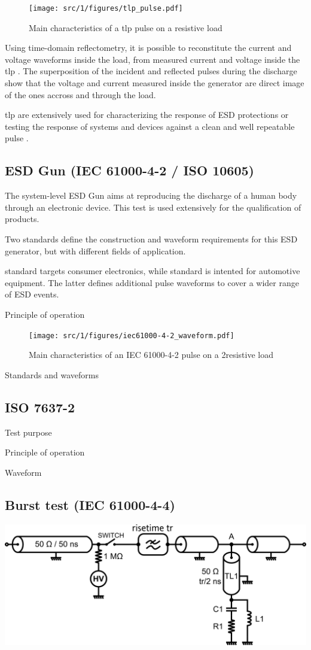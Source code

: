 \begin{figure}[h]
  \centering
  \texttt{[image: src/1/figures/tlp\_pulse.pdf]}
  \caption{Main characteristics of a \gls{tlp} pulse on a resistive load}
  \label{tlp_pulse}
\end{figure}

Using time-domain reflectometry, it is possible to reconstitute the current and voltage waveforms inside the load,
from measured current and voltage inside the \gls{tlp} \cite{TLP}.
The superposition of the incident and reflected pulses during the discharge show that the voltage and current
measured inside the generator are direct image of the ones accross and through the load.

\gls{tlp} are extensively used for characterizing the response of ESD protections \cite{TLPforESDProtectionCz}
or testing the response of systems and devices against a clean and well repeatable pulse \cite{TLPthroubleshooting, LacrampeTransientImmunity}.

\subsection{ESD Gun (IEC 61000-4-2 / ISO 10605)}
The system-level ESD Gun aims at reproducing the discharge of a human body through an electronic device.
This test is used extensively for the qualification of products.

Two standards define the construction and waveform requirements for this ESD generator, but with different fields of application.

\cite{iec61000-4-2} standard targets consumer electronics, while \cite{iso10605} standard is intented for automotive equipment.
The latter defines additional pulse waveforms to cover a wider range of ESD events.

Principle of operation

\begin{figure}[h]
  \centering
  \texttt{[image: src/1/figures/iec61000-4-2\_waveform.pdf]}
  \caption{Main characteristics of an IEC 61000-4-2 pulse on a 2\Omega resistive load}
  \label{tlp_pulse}
\end{figure}

Standards and waveforms

\subsection{ISO 7637-2}
Test purpose

Principle of operation

Waveform

\subsection{Burst test (IEC 61000-4-4)}

\includegraphics[width=\textwidth,height=\textheight,keepaspectratio]{src/2/figures/tlp_iec.png}

